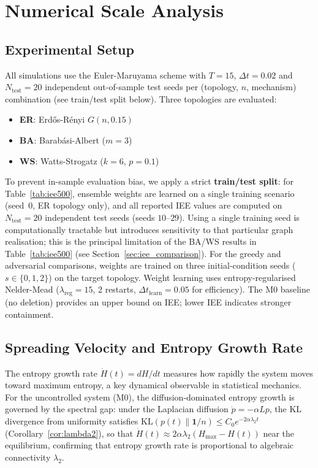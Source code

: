\documentclass[review,12pt]{elsarticle}
\newcommand{\Hmax}{H_{\max}}
\begin{document}
\section{Numerical Scale Analysis}
\label{sec:results}

\subsection{Experimental Setup}

All simulations use the Euler-Maruyama scheme with $T = 15$, $\Delta t = 0.02$
and $N_{\mathrm{test}} = 20$ independent out-of-sample test seeds per
(topology, $n$, mechanism) combination (see train/test split below).
Three topologies are evaluated:
\begin{itemize}
  \item \textbf{ER}: Erd\H{o}s-R\'enyi $G(n, 0.15)$~\cite{erdos1960evolution}
  \item \textbf{BA}: Barab\'asi-Albert ($m=3$)~\cite{barabasi1999emergence}
  \item \textbf{WS}: Watts-Strogatz ($k=6$, $p=0.1$)~\cite{watts1998collective}
\end{itemize}
To prevent in-sample evaluation bias, we apply a strict \textbf{train/test
split}: for Table~\ref{tab:iee500}, ensemble weights are learned on a single
training scenario (seed~0, ER topology only), and all reported IEE values are
computed on $N_{\mathrm{test}}=20$ independent test seeds (seeds $10$--$29$).
Using a single training seed is computationally tractable but introduces
sensitivity to that particular graph realisation; this is the principal
limitation of the BA/WS results in Table~\ref{tab:iee500}
(see Section~\ref{sec:iee_comparison}).
For the greedy and adversarial comparisons, weights are trained on three
initial-condition seeds ($s\in\{0,1,2\}$) on the target topology.
Weight learning uses entropy-regularised Nelder-Mead
($\lambda_{\mathrm{reg}}=15$, 2 restarts, $\Delta t_{\mathrm{learn}}=0.05$
for efficiency). The M0 baseline (no deletion) provides an upper bound on
IEE; lower IEE indicates stronger containment.

\subsection{Spreading Velocity and Entropy Growth Rate}
\label{sec:dHdt}

The entropy growth rate $\dot{H}(t) = dH/dt$ measures how rapidly the
system moves toward maximum entropy, a key dynamical observable in
statistical mechanics.  For the uncontrolled system (M0), the
diffusion-dominated entropy growth is governed by the spectral gap:
under the Laplacian diffusion $\dot{p} = -\alpha L p$, the KL divergence
from uniformity satisfies
$\mathrm{KL}(p(t)\|\mathbf{1}/n) \leq C_0 e^{-2\alpha\lambda_2 t}$
(Corollary~\ref{cor:lambda2}), so that
$\dot{H}(t) \approx 2\alpha\lambda_2 (\Hmax - H(t))$
near the equilibrium, confirming that entropy growth rate is proportional to
algebraic connectivity $\lambda_2$.
\end{document}
